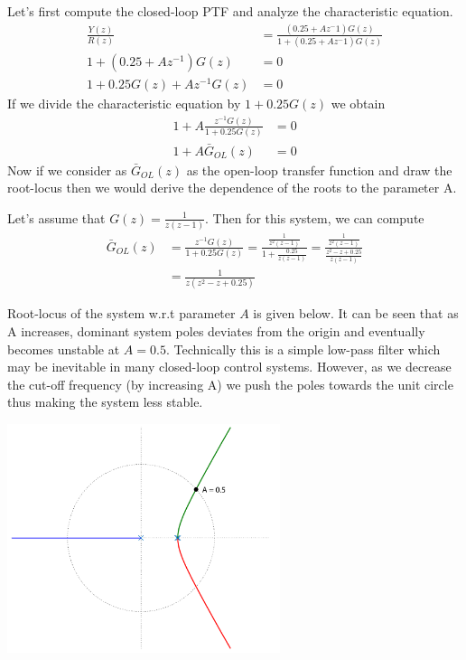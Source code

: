 \documentclass[twoside]{article}
\begin{document}
Let's first compute the closed-loop PTF and analyze the characteristic
equation.
%
\begin{align*}
  \frac{Y(z)}{R(z)} &= \frac{ \left(0.25 + A z^-1 \right) G(z) }{1 +
                      \left (0.25 + A z^-1 \right) G(z)} 
\\
1 + \left( 0.25 + A z^{-1} \right) G(z) &= 0
\\
1 + 0.25 G(z) + A z^{-1} G(z) &= 0
\end{align*}
%
If we divide the characteristic equation by $1 + 0.25 G(z)$ we obtain
%
\begin{align*}
1+ A \frac{z^{-1} G(z)}{1 + 0.25 G(z)} &= 0
\\
1+ A \bar{G}_{OL}(z) &= 0
\end{align*}
%
Now if we consider as $\bar{G}_{OL}(z)$ as the open-loop transfer
function and draw the root-locus then we would derive the dependence 
of the roots to the parameter A. 

Let's assume that $G(z) = \frac{1}{z(z-1)}$. Then for this
system, we can compute
%
\begin{align*}
  \bar{G}_{OL}(z) &= \frac{z^{-1} G(z)}{1 + 0.25 G(z)}
= \frac{\frac{1}{z^2(z-1)}}{1 + \frac{0.25}{z(z-1)}}
= \frac{\frac{1}{z^2(z-1)}}{\frac{z^2 - z + 0.25}{z(z-1)}}
\\
&= \frac{1}{z (z^2 -z + 0.25)}
\end{align*}

Root-locus of the system w.r.t parameter $A$ is given below. It
can be seen that as A increases, dominant system poles deviates
from the origin and eventually becomes unstable at $A = 0.5$.
Technically this is a simple low-pass filter which may be inevitable
in many closed-loop control systems. However, as we decrease 
the cut-off frequency (by increasing A) we push the poles towards 
the unit circle thus making the system less stable.

\begin{center}
\begin{minipage}[h]{\linewidth}
    \begin{center}
      \includegraphics[width=0.6\textwidth]{rlocusA}
    \end{center}
\end{minipage}
\end{center}

\end{document}

